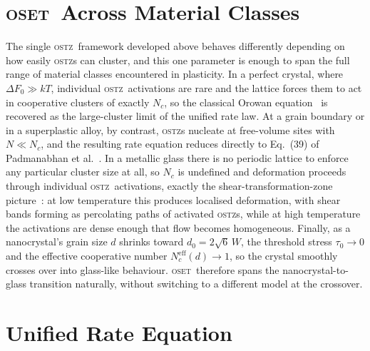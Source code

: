 \documentclass[5p,sort&compress]{elsarticle}
\newcommand{\OSTZ}{\textsc{ostz}}
\newcommand{\OSET}{\textsc{oset}}
\newcommand{\dF}{\Delta F_0}
\begin{document}
\section{\OSET\ Across Material Classes}
\label{sec:classes}

The single \OSTZ\ framework developed above behaves differently
depending on how easily \OSTZ s can cluster, and this one parameter
is enough to span the full range of material classes encountered in
plasticity. In a perfect crystal, where $\dF\gg kT$, individual
\OSTZ\ activations are rare and the lattice forces them to act in
cooperative clusters of exactly $N_c$, so the classical Orowan
equation~\cite{orowan1940} is recovered as the large-cluster limit
of the unified rate law. At a grain boundary or in a superplastic alloy, by contrast,
\OSTZ s nucleate at free-volume sites with $N\ll N_c$, and the
resulting rate equation reduces directly to Eq.~(39) of
Padmanabhan et al.~\cite{pad-part1}. In a metallic glass there is no
periodic lattice to enforce any particular cluster size at all, so
$N_c$ is undefined and deformation proceeds through individual
\OSTZ\ activations, exactly the shear-transformation-zone
picture~\cite{argon1979,falk-langer1998}: at low temperature this
produces localised deformation, with shear bands forming as
percolating paths of activated \OSTZ s, while at high temperature
the activations are dense enough that flow becomes homogeneous.
Finally, as a nanocrystal's grain size $d$ shrinks toward
$d_0=2\sqrt6\,W$, the threshold stress $\tau_0\to0$ and the
effective cooperative number $N_c^\text{eff}(d)\to1$, so the
crystal smoothly crosses over into glass-like behaviour. \OSET\
therefore spans the nanocrystal-to-glass transition naturally,
without switching to a different model at the crossover.

\section{Unified Rate Equation}
\label{sec:unified}
\end{document}
